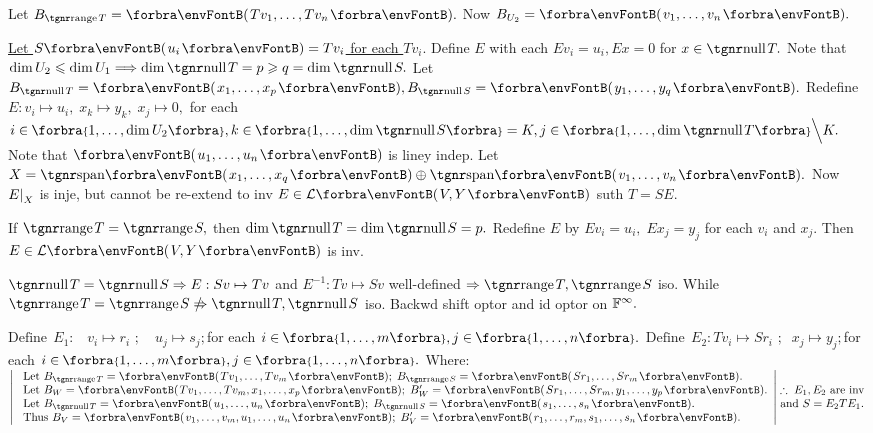  \;Let $B_{\range T}=\Par{Tv_1,\dots,Tv_n}.$ Now $B_{U_2}=\Par{v_1,\dots,v_n}.$\par\quad
\uline{Let $S\Par{u_i}=Tv_i$ for each $Tv_i.$} \;Define $E$ with each $Ev_i=u_i,Ex=0$ for $x\in\null T.$\PfEnd\vspace{4pt}\quad
\AComm {} \;Note that $\dim U_2\leqslant\dim U_1\Longrightarrow\dim\null T=p\geqslant q=\dim\null S.$\parCom\quad
Let $B_{\null T}=\Par{x_1,\dots,x_p},B_{\null S}=\Par{y_1,\dots,y_q}.$ Redefine $E:v_i\mapsto u_i,\;x_k\mapsto y_k,\;x_j\mapsto 0,$\parCom\quad
for each $i\in\;\!\!\Bra{1,\dots,\dim U_2},k\in\;\!\!\Bra{1,\dots,\dim\null S}=K,j\in\;\!\!\Bra{1,\dots,\dim\null T}\Backslash[\Big]K.$\parCom\quad
Note that $\Par{u_1,\dots,u_n}$ is liney indep. Let $X=\Span{x_1,\dots,x_q}\oplus\Span{v_1,\dots,v_n}.$\parCom\quad
Now $E\text{\normalsize|}_X$ is inje, but cannot be re-extend to inv $E\in\Lm{V,Y}$ suth $T=SE.$\par{}\vspace{4pt}\quad
\ACoro {} \;If $\range T=\range S,$ then $\dim\null T=\dim\null S=p.$\parCor\quad
Redefine $E$ by $Ev_i=u_i,\;Ex_j=y_j$ for each $v_i$ and $x_j.$ Then $E\in\Lm{V,Y}$ is inv.\PfEnd
\SepLine

\BulletPointX\ANote $\null T=\null S\Rightarrow E:Sv\mapsto Tv$ and $E^{-1}:Tv\mapsto Sv$ well-defined $\Rightarrow\range T,\range S$ iso.\parNot{\IndentB}
While $\range T=\range S\notRightarrow\null T,\null S$ iso. \;\AExa Backwd shift optor and id optor on ${\mathbb{F}}^{\infty}.$
\SepLine

$\text{Define}\;\,E_1:\,\,\,\,\, v_i\mapsto r_i\,\,;\quad u_j\mapsto s_j;$\quad for each $i\in\;\!\!\Bra{1,\dots,m},j\in\;\!\!\Bra{1,\dots,n}.$\parSol{}
$\text{Define}\;\,E_2:Tv_i\mapsto Sr_i\,\,;\;\;x_j\mapsto y_j;$\quad for each $i\in\;\!\!\Bra{1,\dots,m},j\in\;\!\!\Bra{1,\dots,n}.$
Where:\parSol{\vspace{2pt}}
$\MathLeftrightMid{l}{$
	Let $B_{\range T}=\Par{Tv_1,\dots,Tv_m};\;B_{\range S}=\Par{Sr_1,\dots,Sr_m}.\\ $
	Let $B_W=\Par{Tv_1,\dots,Tv_m,x_1,\dots,x_p};\;B_W'=\Par{Sr_1,\dots,Sr_m,y_1,\dots,y_p}.\\ $
	Let $B_{\null T}=\Par{u_1,\dots,u_n};\;B_{\null S}=\Par{s_1,\dots,s_n}.\\ $
	Thus $B_V=\Par{v_1,\dots,v_m,u_1,\dots,u_n};\;B_V'=\Par{r_1,\dots,r_m,s_1,\dots,s_n}.}\hMath{c}{}{}{\therefore\;E_1,E_2$ are inv$ \\ $and $S=E_2 TE_1.}$\PfEnd
\SepLine

